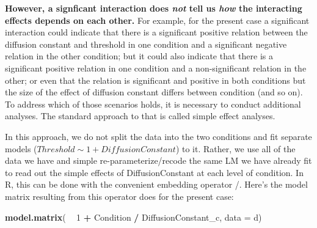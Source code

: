 \documentclass[
]{article}
\newenvironment{Shaded}{\begin{snugshade}}{\end{snugshade}}
\newcommand{\DataTypeTok}[1]{\textcolor[rgb]{0.13,0.29,0.53}{#1}}
\newcommand{\DecValTok}[1]{\textcolor[rgb]{0.00,0.00,0.81}{#1}}
\newcommand{\KeywordTok}[1]{\textcolor[rgb]{0.13,0.29,0.53}{\textbf{#1}}}
\newcommand{\NormalTok}[1]{#1}
\newcommand{\OperatorTok}[1]{\textcolor[rgb]{0.81,0.36,0.00}{\textbf{#1}}}
\newcommand{\StringTok}[1]{\textcolor[rgb]{0.31,0.60,0.02}{#1}}
\begin{document}
\textbf{However, a signficant interaction does \emph{not} tell us
\emph{how} the interacting effects depends on each other.} For example,
for the present case a significant interaction could indicate that there
is a significant positive relation between the diffusion constant and
threshold in one condition and a significant negative relation in the
other condition; but it could also indicate that there is a significant
positive relation in one condition and a non-significant relation in the
other; or even that the relation is significant and positive in both
conditions but the size of the effect of diffusion constant differs
between condition (and so on). To address which of those scenarios
holds, it is necessary to conduct additional analyses. The standard
approach to that is called simple effect analyses.

In this approach, we do not split the data into the two conditions and
fit separate models (\(Threshold \sim 1 + DiffusionConstant\)) to it.
Rather, we use all of the data we have and simple re-parameterize/recode
the same LM we have already fit to read out the simple effects of
DiffusionConstant at each level of condition. In R, this can be done
with the convenient embedding operator /. Here's the model matrix
resulting from this operator does for the present case:

\footnotesize

\begin{Shaded}
\begin{Highlighting}[]
\KeywordTok{model.matrix}\NormalTok{( }\OperatorTok{~}\StringTok{ }\DecValTok{1} \OperatorTok{+}\StringTok{ }\NormalTok{Condition }\OperatorTok{/}\StringTok{ }\NormalTok{DiffusionConstant_c, }\DataTypeTok{data =}\NormalTok{ d)}
\end{Highlighting}
\end{Shaded}
\end{document}
